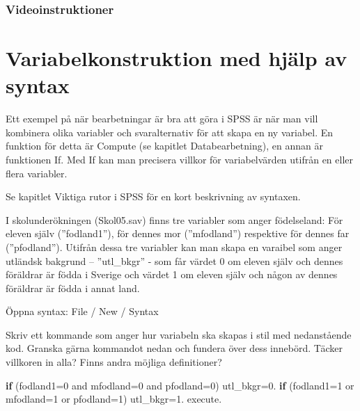 \documentclass[
]{book}
\newenvironment{Shaded}{\begin{snugshade}}{\end{snugshade}}
\newcommand{\AttributeTok}[1]{\textcolor[rgb]{0.77,0.63,0.00}{#1}}
\newcommand{\ControlFlowTok}[1]{\textcolor[rgb]{0.13,0.29,0.53}{\textbf{#1}}}
\newcommand{\DecValTok}[1]{\textcolor[rgb]{0.00,0.00,0.81}{#1}}
\newcommand{\FloatTok}[1]{\textcolor[rgb]{0.00,0.00,0.81}{#1}}
\newcommand{\NormalTok}[1]{#1}
\newcommand{\OtherTok}[1]{\textcolor[rgb]{0.56,0.35,0.01}{#1}}
\begin{document}
\hypertarget{videoinstruktioner-1}{%
\subsection{Videoinstruktioner}\label{videoinstruktioner-1}}

\hypertarget{variabelkonstruktion-med-hjuxe4lp-av-syntax}{%
\chapter{Variabelkonstruktion med hjälp av syntax}\label{variabelkonstruktion-med-hjuxe4lp-av-syntax}}

Ett exempel på när bearbetningar är bra att göra i SPSS är när man vill kombinera olika variabler och
svaralternativ för att skapa en ny variabel. En funktion för detta är Compute (se kapitlet Databearbetning), en annan är funktionen If. Med If kan man precisera villkor för variabelvärden utifrån en eller flera variabler.

Se kapitlet Viktiga rutor i SPSS för en kort beskrivning av syntaxen.

I skolunderökningen (Skol05.sav) finns tre variabler som anger födelseland: För eleven själv
(''fodland1''), för dennes mor (''mfodland'') respektive för dennes far (''pfodland''). Utifrån dessa tre
variabler kan man skapa en varaibel som anger utländsk bakgrund -- ''utl\_bkgr'' - som får värdet 0 om
eleven själv och dennes föräldrar är födda i Sverige och värdet 1 om eleven själv och någon av dennes
föräldrar är födda i annat land.

Öppna syntax: File / New / Syntax

Skriv ett kommande som anger hur variabeln ska skapas i stil med nedanstående kod. Granska gärna kommandot nedan och fundera över dess innebörd. Täcker villkoren in alla? Finns andra möjliga definitioner?

\begin{Shaded}
\begin{Highlighting}[]
\ControlFlowTok{if}\NormalTok{ (}\AttributeTok{fodland1=}\DecValTok{0}\NormalTok{ and }\AttributeTok{mfodland=}\DecValTok{0}\NormalTok{ and }\AttributeTok{pfodland=}\DecValTok{0}\NormalTok{) utl\_bkgr}\OtherTok{=}\FloatTok{0.}
\ControlFlowTok{if}\NormalTok{ (}\AttributeTok{fodland1=}\DecValTok{1}\NormalTok{ or }\AttributeTok{mfodland=}\DecValTok{1}\NormalTok{ or }\AttributeTok{pfodland=}\DecValTok{1}\NormalTok{) utl\_bkgr}\OtherTok{=}\FloatTok{1.}
\NormalTok{execute.}
\end{Highlighting}
\end{Shaded}
\end{document}
